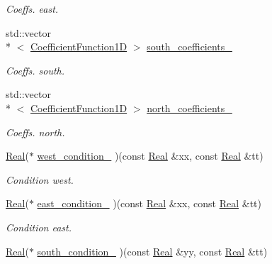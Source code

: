 \begin{DoxyCompactItemize}
\begin{DoxyCompactList}\small\item\em Coeffs. east. \end{DoxyCompactList}\item 
std\+::vector\\*
$<$ \hyperlink{group__c07-mim__ops_gaa79593eeb6676d6011db339e01983909}{Coefficient\+Function1\+D} $>$ \hyperlink{classmtk_1_1RobinBCDescriptor2D_a97335ce1103cb89ab0696d5ae2fc6d37}{south\+\_\+coefficients\+\_\+}
\begin{DoxyCompactList}\small\item\em Coeffs. south. \end{DoxyCompactList}\item 
std\+::vector\\*
$<$ \hyperlink{group__c07-mim__ops_gaa79593eeb6676d6011db339e01983909}{Coefficient\+Function1\+D} $>$ \hyperlink{classmtk_1_1RobinBCDescriptor2D_a91fc1a7322ceda8f5409e1fe6490861c}{north\+\_\+coefficients\+\_\+}
\begin{DoxyCompactList}\small\item\em Coeffs. north. \end{DoxyCompactList}\item 
\hyperlink{group__c01-roots_gac080bbbf5cbb5502c9f00405f894857d}{Real}($\ast$ \hyperlink{classmtk_1_1RobinBCDescriptor2D_a3d04c776a3fa34cf4fea7c484e2056d6}{west\+\_\+condition\+\_\+} )(const \hyperlink{group__c01-roots_gac080bbbf5cbb5502c9f00405f894857d}{Real} \&xx, const \hyperlink{group__c01-roots_gac080bbbf5cbb5502c9f00405f894857d}{Real} \&tt)
\begin{DoxyCompactList}\small\item\em Condition west. \end{DoxyCompactList}\item 
\hyperlink{group__c01-roots_gac080bbbf5cbb5502c9f00405f894857d}{Real}($\ast$ \hyperlink{classmtk_1_1RobinBCDescriptor2D_a9b2b901adfa258a8e05788857de31c8a}{east\+\_\+condition\+\_\+} )(const \hyperlink{group__c01-roots_gac080bbbf5cbb5502c9f00405f894857d}{Real} \&xx, const \hyperlink{group__c01-roots_gac080bbbf5cbb5502c9f00405f894857d}{Real} \&tt)
\begin{DoxyCompactList}\small\item\em Condition east. \end{DoxyCompactList}\item 
\hyperlink{group__c01-roots_gac080bbbf5cbb5502c9f00405f894857d}{Real}($\ast$ \hyperlink{classmtk_1_1RobinBCDescriptor2D_aa45a1867ab80b81966f4221bbdb576ff}{south\+\_\+condition\+\_\+} )(const \hyperlink{group__c01-roots_gac080bbbf5cbb5502c9f00405f894857d}{Real} \&yy, const \hyperlink{group__c01-roots_gac080bbbf5cbb5502c9f00405f894857d}{Real} \&tt)

\end{DoxyCompactItemize}
